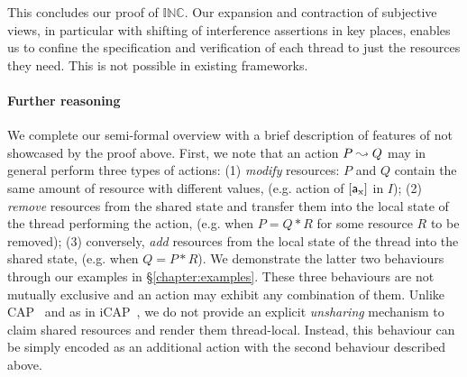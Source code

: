 This concludes our \colosl proof of $\mathbb{INC}$. Our expansion and contraction of subjective
views, in particular with shifting of interference assertions in key places, enables us to confine the specification and verification of each thread to just the resources they need. This  is not possible in existing frameworks.
%
\paragraph{\textbf{Further \colosl reasoning}}
We complete our semi-formal overview with a brief description of features of \colosl not
showcased by the proof above. First, we note that an action $P\mathrel{\leadsto} Q$
may in general perform three types of actions: (1)
  \emph{modify} resources: $P$ and $Q$ contain the same amount of
  resource with different values, (e.g. action of $[\mathsf{a}_{\text{x}}]$ in $I$);
  (2)
  \emph{remove} resources from the shared state and transfer them into
  the local state of the thread performing the action, (e.g. when $P = Q * R$ for some resource $R$ to be removed);
  (3)
  conversely, \emph{add} resources from the local state of the thread
  into the shared state, (e.g. when $Q = P * R$).
We demonstrate the latter two behaviours through our examples in
\S\ref{chapter:examples}. These three behaviours are not mutually
exclusive and an action may exhibit any combination of them.  Unlike
CAP~\cite{cap-ecoop10} and as in iCAP~\cite{icap}, we do not provide
an explicit \emph{unsharing} mechanism to claim shared
resources and render them thread-local. Instead, this behaviour can
be simply encoded as an additional action with the second behaviour
described above.
%




